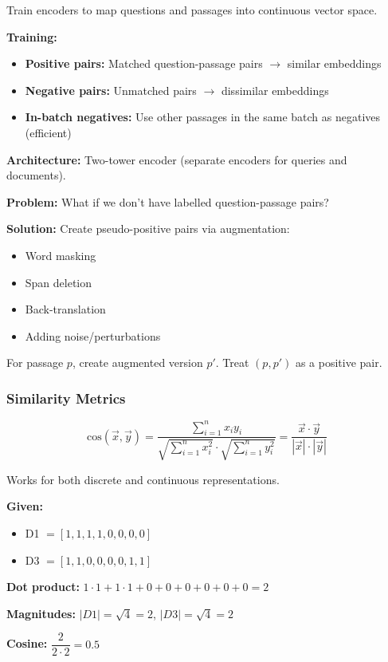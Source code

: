 \begin{defbox}
Train encoders to map questions and passages into continuous vector space.

\textbf{Training:}
\begin{itemize}
  \item \textbf{Positive pairs:} Matched question-passage pairs $\to$ similar embeddings
  \item \textbf{Negative pairs:} Unmatched pairs $\to$ dissimilar embeddings
  \item \textbf{In-batch negatives:} Use other passages in the same batch as negatives (efficient)
\end{itemize}

\textbf{Architecture:} Two-tower encoder (separate encoders for queries and documents).
\end{defbox}

\begin{defbox}
\textbf{Problem:} What if we don't have labelled question-passage pairs?

\textbf{Solution:} Create pseudo-positive pairs via augmentation:
\begin{itemize}
  \item Word masking
  \item Span deletion
  \item Back-translation
  \item Adding noise/perturbations
\end{itemize}

For passage $p$, create augmented version $p'$. Treat $(p, p')$ as a positive pair.
\end{defbox}

\bigseparator

\subsubsection{Similarity Metrics}

\begin{defbox}
\[
\text{cos}(\vec{x}, \vec{y}) = \frac{\sum_{i=1}^{n} x_i y_i}{\sqrt{\sum_{i=1}^{n} x_i^2} \cdot \sqrt{\sum_{i=1}^{n} y_i^2}} = \frac{\vec{x} \cdot \vec{y}}{|\vec{x}| \cdot |\vec{y}|}
\]

Works for both discrete and continuous representations.
\end{defbox}

\begin{exbox}
\textbf{Given:}
\begin{itemize}
  \item D1 $= [1, 1, 1, 1, 0, 0, 0, 0]$
  \item D3 $= [1, 1, 0, 0, 0, 0, 1, 1]$
\end{itemize}

\textbf{Dot product:} $1 \cdot 1 + 1 \cdot 1 + 0 + 0 + 0 + 0 + 0 + 0 = 2$

\textbf{Magnitudes:} $|D1| = \sqrt{4} = 2$, \quad $|D3| = \sqrt{4} = 2$

\textbf{Cosine:} $\dfrac{2}{2 \cdot 2} = \boxed{0.5}$
\end{exbox}

